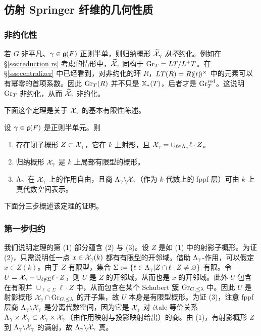 \subsection{仿射 Springer 纤维的几何性质}

\subsubsection{非约化性} 若 $G$ 非平凡、$\gamma\in\mathfrak{g}(F)$ 正则半单，则归纳概形 $\widetilde{\mathcal{X}}_{\gamma}$ {\em 从不}约化。例如在 \S\ref{sss:reduction rs} 考虑的情形中，$\widetilde{\mathcal{X}}_{\gamma}$ 同构于 $\textup{Gr}_{T}=LT/L^{+}T$。在 \S\ref{sss:centralizer} 中已经看到，对非约化的环 $R$，$LT(R)=R(\!(t)\!)^{\times}$ 中的元素可以有幂零的首项系数。因此 $\textup{Gr}_{T}(R)$ 并不只是 $\mathbb{X}_*(T)$，后者才是 $\textup{Gr}^{\textup{red}}_{T}$。这说明 $\textup{Gr}_{T}$ 非约化，从而 $\widetilde{\mathcal{X}}_{\gamma}$ 非约化。

下面这个定理是关于 $\mathcal{X}_{\gamma}$ 的基本有限性陈述。

\begin{theorem}\label{th:ft quot} 设 $\gamma\in \mathfrak{g}(F)$ 是正则半单元。则
\begin{enumerate}
\item 存在闭子概形 $Z\subset \mathcal{X}_{\gamma}$，它在 $k$ 上射影，且 $\mathcal{X}_{\gamma}=\cup_{\ell\in\Lambda_{\gamma}}\ell\cdot Z$。
\item 归纳概形 $\mathcal{X}_{\gamma}$ 是 $k$ 上局部有限型的概形。
\item $\Lambda_{\gamma}$ 在 $\mathcal{X}_{\gamma}$ 上的作用自由，且商 $\Lambda_{\gamma}\backslash\mathcal{X}_{\gamma}$（作为 $k$ 代数上的 fppf 层）可由 $k$ 上真代数空间表示。
\end{enumerate}
\end{theorem}

下面分三步概述该定理的证明。

\subsubsection{第一步归约} 我们说明定理的第 (1) 部分蕴含 (2) 与 (3)。设 $Z$ 是如 (1) 中的射影子概形。为证 (2)，只需说明任一点 $x\in \mathcal{X}_{\gamma}(k)$ 都有有限型的开邻域。借助 $\Lambda_{\gamma}$-作用，可以假定 $x\in Z(k)$。由于 $Z$ 有限型，集合 $\Sigma:=\{\ell\in \Lambda_{\gamma}|Z\cap\ell\cdot Z\neq\varnothing\}$ 有限。令 $U=\mathcal{X}_{\gamma}-\cup_{\ell\notin\Sigma}\ell\cdot Z$，则 $U$ 是 $Z$ 的开邻域，从而也是 $x$ 的开邻域。此外 $U$ 包含在有限并 $\cup_{\ell\in\Sigma}\ell\cdot Z$ 中，从而包含在某个 Schubert 簇 $\textup{Gr}_{G,\leq\lambda}$ 中。因此 $U$ 是射影概形 $\mathcal{X}_{\gamma}\cap\textup{Gr}_{G,\leq\lambda}$ 的开子集，故 $U$ 本身是有限型概形。为证 (3)，注意 fppf 层商 $\Lambda_{\gamma}\backslash\mathcal{X}_{\gamma}$ 是分离代数空间，因为它是 $\mathcal{X}_{\gamma}$ 对 étale 等价关系 $\Lambda_{\gamma}\times\mathcal{X}_{\gamma}\subset \mathcal{X}_{\gamma}\times\mathcal{X}_{\gamma}$（由作用映射与投影映射给出）的商。由 (1)，有射影概形 $Z$ 到 $\Lambda_{\gamma}\backslash\mathcal{X}_{\gamma}$ 的满射，故 $\Lambda_{\gamma}\backslash\mathcal{X}_{\gamma}$ 真。

